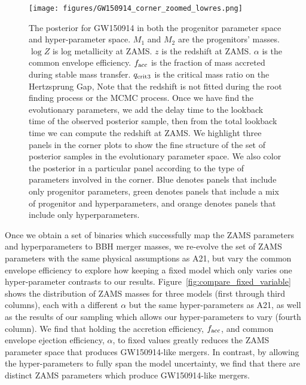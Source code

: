 \documentclass[twocolumn]{aastex631}
\begin{document}
\begin{figure*}[h]
    \texttt{[image: figures/GW150914\_corner\_zoomed\_lowres.png]}
    \caption{The posterior for GW150914 in both the progenitor parameter space and hyper-parameter space.
    $M_1$ and $M_2$ are the progenitors' masses. $\log{Z}$ is log metallicity at ZAMS.
    $z$ is the redshift at ZAMS.
    $\alpha$ is the common envelope efficiency.
    $f_{\rm acc}$ is the fraction of mass accreted during stable mass transfer.
    $q_{\rm crit 3}$ is the critical mass ratio on the Hertzsprung Gap,
    Note that the redshift is not fitted during the root finding process or the MCMC process.
    Once we have find the evolutionary parameters, we add the delay time to the lookback time of the observed posterior sample,
    then from the total lookback time we can compute the redshift at ZAMS.
    We highlight three panels in the corner plots to show the fine structure of the set of posterior samples in the evolutionary parameter space.
    We also color the posterior in a particular panel according to the type of parameters involved in the corner.
    Blue denotes panels that include only progenitor parameters,
    green denotes panels that include a mix of progenitor and hyperparameters,
    and orange denotes panels that include only hyperparameters.
    }
    \label{fig:GW150914_posterior}
\end{figure*}

Once we obtain a set of binaries which successfully map the ZAMS parameters and
hyperparameters to BBH merger masses, we re-evolve the set of ZAMS parameters
with the same physical assumptions as A21, but vary the common envelope
efficiency to explore how keeping a fixed model which only varies one
hyper-parameter contrasts to our results.
Figure~\ref{fig:compare_fixed_variable} shows the distribution of ZAMS masses
for three models (first through third columns), each with a different $\alpha$
but the same hyper-parameters as A21, as well as the results of our sampling
which allows our hyper-parameters to vary (fourth column). We find that holding
the accretion efficiency, $f_{\rm{acc}}$, and common envelope ejection
efficiency, $\alpha$, to fixed values greatly reduces the ZAMS parameter space
that produces GW150914-like mergers. In contrast, by allowing the
hyper-parameters to fully span the model uncertainty, we find that there are
distinct ZAMS parameters which produce GW150914-like mergers.
\end{document}
